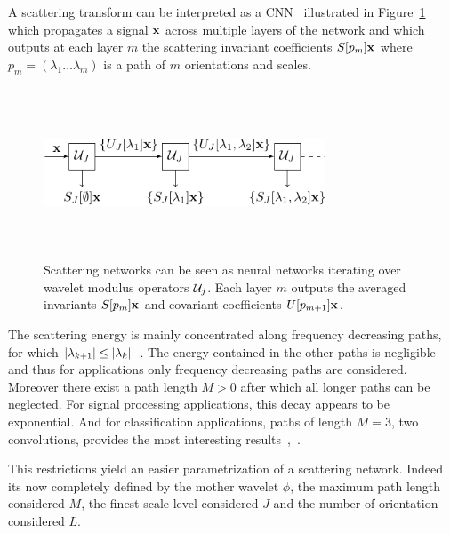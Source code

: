 \documentclass{article}
\begin{document}
    A scattering transform can be interpreted as a CNN~\cite{oyallon2014deep} illustrated in Figure~\ref{fig:SCN 1} which propagates a signal ${\bf x}$ across multiple layers of the network and which outputs at each layer $m$ the scattering invariant coefficients $S[p_{m}]{\bf x}$ where $p_{m}=(\lambda_{1} \dots \lambda_{m})$ is a path of $m$ orientations and scales.
    
    \begin{figure}
      \begin{center}
        \includegraphics[width=3.3in, height=2in, keepaspectratio]{scatnet_crop.pdf}
        \caption[Scattering convolution network.]{\centering  Scattering networks can be seen as neural networks iterating over wavelet  modulus  operators $\mathcal{U}_{j}$. Each layer $m$ outputs the averaged  invariants $S[p_{m}]{\bf x}$ and covariant coefficients $U[p_{m+1}]{\bf x}$.}
        \label{fig:SCN 1}
      \end{center}
      \vspace{-15pt}
    \end{figure}
    
    The scattering energy is mainly concentrated along frequency decreasing paths, \ie for which $\left| \lambda_{k+1} \right| \leq \left| \lambda_{k} \right|$~\cite{mallat2012gis}. The energy contained in the other paths is negligible and thus for applications only frequency decreasing paths are considered. Moreover there exist a path length $M > 0$ after which all longer paths can be neglected. For signal processing applications, this decay appears to be exponential. And for classification applications, paths of length $M = 3$, \ie two convolutions, provides the most interesting results~\cite{anden2011multiscale},~\cite{bruna2010classification}.
      
    This restrictions yield an easier parametrization of a scattering network. Indeed its now completely defined by the mother wavelet $\phi$, the maximum path length considered $M$, the finest scale level considered $J$ and the number of orientation considered $L$.
      
\end{document}
